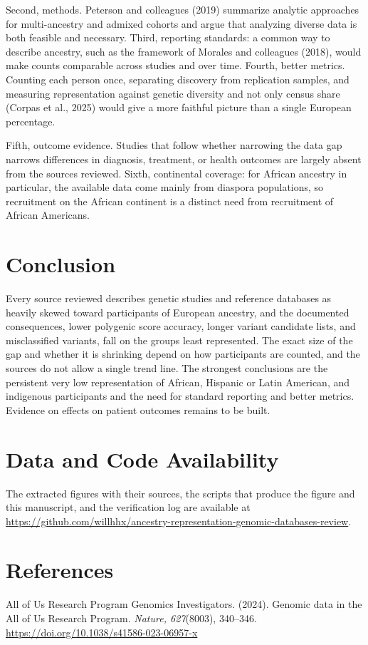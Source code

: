 \documentclass[12pt]{article}
\begin{document}
Second, methods. Peterson and colleagues (2019) summarize analytic approaches for multi-ancestry and admixed cohorts and argue that analyzing diverse data is both feasible and necessary. Third, reporting standards: a common way to describe ancestry, such as the framework of Morales and colleagues (2018), would make counts comparable across studies and over time. Fourth, better metrics. Counting each person once, separating discovery from replication samples, and measuring representation against genetic diversity and not only census share (Corpas et al., 2025) would give a more faithful picture than a single European percentage.

Fifth, outcome evidence. Studies that follow whether narrowing the data gap narrows differences in diagnosis, treatment, or health outcomes are largely absent from the sources reviewed. Sixth, continental coverage: for African ancestry in particular, the available data come mainly from diaspora populations, so recruitment on the African continent is a distinct need from recruitment of African Americans.

\section*{Conclusion}
Every source reviewed describes genetic studies and reference databases as heavily skewed toward participants of European ancestry, and the documented consequences, lower polygenic score accuracy, longer variant candidate lists, and misclassified variants, fall on the groups least represented. The exact size of the gap and whether it is shrinking depend on how participants are counted, and the sources do not allow a single trend line. The strongest conclusions are the persistent very low representation of African, Hispanic or Latin American, and indigenous participants and the need for standard reporting and better metrics. Evidence on effects on patient outcomes remains to be built.

\section*{Data and Code Availability}
{\raggedright The extracted figures with their sources, the scripts that produce the figure and this manuscript, and the verification log are available at \url{https://github.com/willhhx/ancestry-representation-genomic-databases-review}.\par}

\section*{References}
\begingroup\small\setlength{\parindent}{-0.5in}\setlength{\leftskip}{0.5in}\setlength{\parskip}{4pt}
All of Us Research Program Genomics Investigators. (2024). Genomic data in the All of Us Research Program. \emph{Nature, 627}(8003), 340--346. \url{https://doi.org/10.1038/s41586-023-06957-x}
\end{document}
